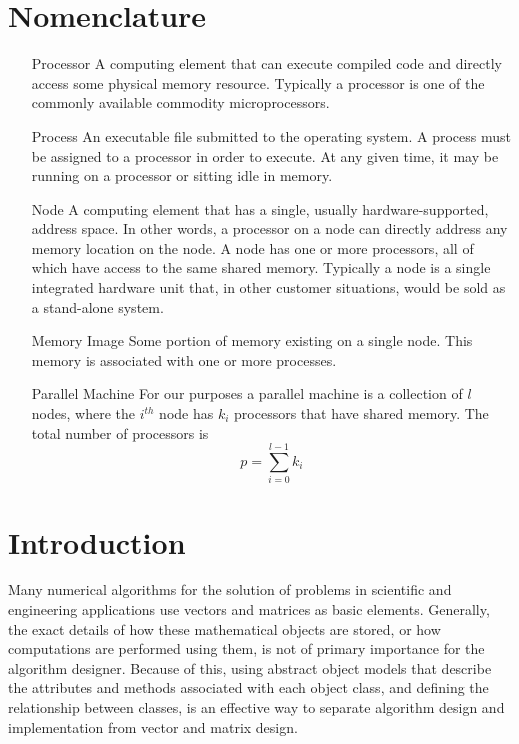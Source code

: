 \documentclass[10pt,relax]{PetraObjectModel}
\begin{document}
\section*{Nomenclature}
\begin{itemize}
\item[Processor] A computing element that can execute compiled
code and directly access some physical memory resource.  Typically
a processor is one of the commonly available commodity microprocessors.

\item[Process] An executable file submitted to the operating system.
A process must be assigned to a processor in order to execute.  At
any given time, it may be running on a processor or sitting idle in
memory.

\item[Node] A computing element that has a single, usually
hardware-supported, address space.  In other words, a processor
on a node can directly address any memory location on the node.
A node has one or more processors, all of which have access to the
same shared memory.  Typically a node is a single integrated hardware
unit that, in other customer situations, would be sold as a
stand-alone
system.

\item[Memory Image]  Some portion of memory existing on a single node.
This memory is associated with one or more processes.


\item[Parallel Machine] For our purposes a parallel machine is a
collection of $l$ nodes, where the $i^{th}$ node has $k_i$ processors that have
shared memory.  The total number of processors is
\begin{equation}
p = \sum_{i=0}^{l-1} k_i
\end{equation}

\end{itemize}

\newpage

\section{Introduction}


Many numerical algorithms for the solution of problems in
scientific and engineering applications use vectors and
matrices as basic elements.   Generally, the exact details
of how these mathematical objects are stored, or how computations
are performed using them, is not of primary importance for the
algorithm designer.  Because of this, using abstract object models
that describe the attributes and methods associated with each
object class, and defining the relationship between classes, is an
effective way to separate algorithm design and implementation from
vector and matrix design.
\end{document}
